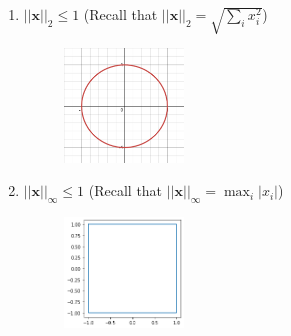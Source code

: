 \documentclass[a4paper]{article}
\theoremstyle{definition}
\newenvironment{soln}{
	\leavevmode\color{blue}\ignorespaces
}{}
\begin{document}
\begin{enumerate}
		\item 	$||\mathbf{x}||_2 \leq 1$ (Recall that $||\mathbf{x}||_2 =\sqrt{\sum_i x_i^2}$) \\
			\begin{soln}
			 \begin{figure}[ht!]
			     \centering
			     \includegraphics[width=0.3\textwidth]{hw1/norm2.png}  
			     \captionsetup{labelformat=empty}
			     \caption{}
			     \label{fig:my_label2}
			 \end{figure}
		\end{soln}
		\item 	$||\mathbf{x}||_\infty \leq 1$ (Recall that $||\mathbf{x}||_\infty = \max_i |x_i|$) \\
			\begin{soln}
			 \begin{figure}[ht!]
			     \centering
			     \includegraphics[width=0.3\textwidth]{hw1/norm3.png}  
			     \captionsetup{labelformat=empty}
			     \caption{}
			     \label{fig:my_label3}
			 \end{figure}
		\end{soln}
	\end{enumerate}
	
\end{document}

